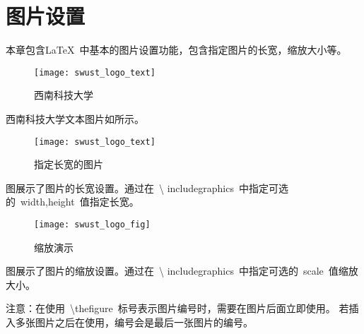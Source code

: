 \chapter{图片设置}

本章包含\LaTeX\ 中基本的图片设置功能，包含指定图片的长宽，缩放大小等。

\begin{figure}[ht]
  \centering
  \texttt{[image: swust\_logo\_text]}
  \caption{西南科技大学}
\end{figure}
西南科技大学文本图片如\thefigure 所示。

\begin{figure}[ht]
  \centering
  \texttt{[image: swust\_logo\_text]}
  \caption{指定长宽的图片}
\end{figure}

图\thefigure 展示了图片的长宽设置。通过在~\textbackslash
includegraphics~中指定可选的~width,height~值指定长宽。

\begin{figure}[ht]
  \centering
  \texttt{[image: swust\_logo\_fig]}
  \caption{缩放演示}
\end{figure}

图\thefigure 展示了图片的缩放设置。通过在~\textbackslash
includegraphics~中指定可选的~scale~值缩放大小。

注意：在使用~\textbackslash thefigure~标号表示图片编号时，需要在图片后面立即使用。
若插入多张图片之后在使用，编号会是最后一张图片的编号。
